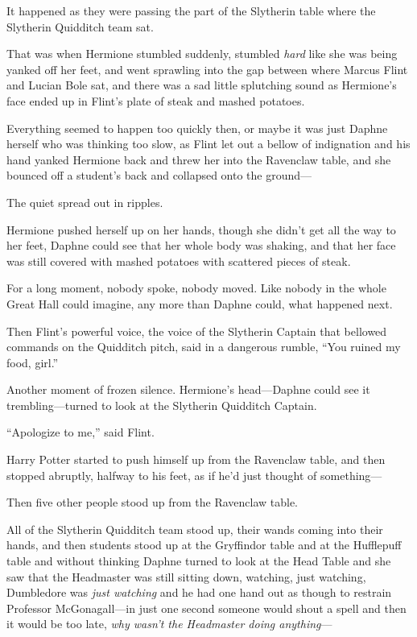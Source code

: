 It happened as they were passing the part of the Slytherin table where the Slytherin Quidditch team sat.

That was when Hermione stumbled suddenly, stumbled \emph{hard} like she was being yanked off her feet, and went sprawling into the gap between where Marcus Flint and Lucian Bole sat, and there was a sad little splutching sound as Hermione’s face ended up in Flint’s plate of steak and mashed potatoes.

Everything seemed to happen too quickly then, or maybe it was just Daphne herself who was thinking too slow, as Flint let out a bellow of indignation and his hand yanked Hermione back and threw her into the Ravenclaw table, and she bounced off a student’s back and collapsed onto the ground—

The quiet spread out in ripples.

Hermione pushed herself up on her hands, though she didn’t get all the way to her feet, Daphne could see that her whole body was shaking, and that her face was still covered with mashed potatoes with scattered pieces of steak.

For a long moment, nobody spoke, nobody moved. Like nobody in the whole Great Hall could imagine, any more than Daphne could, what happened next.

Then Flint’s powerful voice, the voice of the Slytherin Captain that bellowed commands on the Quidditch pitch, said in a dangerous rumble, “You ruined my food, girl.”

Another moment of frozen silence. Hermione’s head—Daphne could see it trembling—turned to look at the Slytherin Quidditch Captain.

“Apologize to me,” said Flint.

Harry Potter started to push himself up from the Ravenclaw table, and then stopped abruptly, halfway to his feet, as if he’d just thought of something—

Then five other people stood up from the Ravenclaw table.

All of the Slytherin Quidditch team stood up, their wands coming into their hands, and then students stood up at the Gryffindor table and at the Hufflepuff table and without thinking Daphne turned to look at the Head Table and she saw that the Headmaster was still sitting down, watching, just watching, Dumbledore was \emph{just watching} and he had one hand out as though to restrain Professor McGonagall—in just one second someone would shout a spell and then it would be too late, \emph{why wasn’t the Headmaster doing anything}—

